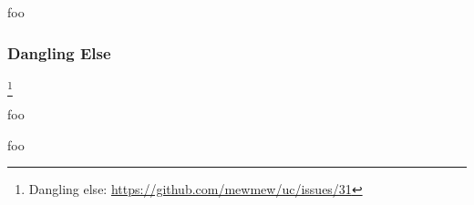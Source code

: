 foo

\subsubsection{Dangling Else}

%
%
%
%
%


\footnote{Dangling else: \url{https://github.com/mewmew/uc/issues/31}}

foo


foo

%
%
%
%
%




